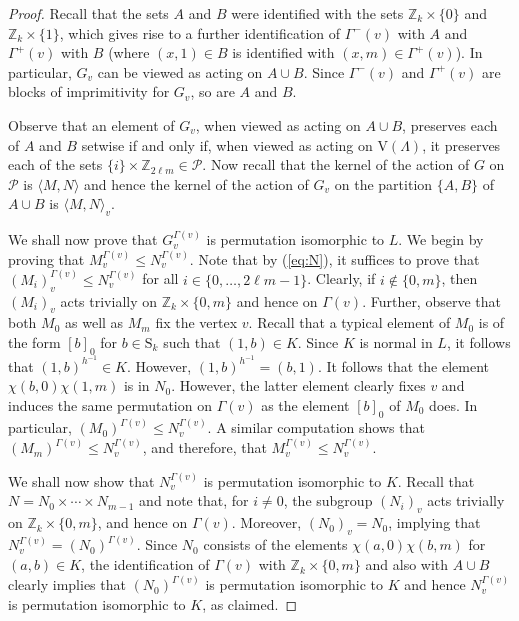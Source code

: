 \documentclass{amsart}
\theoremstyle{definition}
\begin{document}
\begin{proof}
Recall that the sets $A$ and $B$ were identified with the sets ${\mathbb Z}_k\times \{0\}$ and ${\mathbb Z}_k\times \{1\} $, which gives rise to a further identification of $\Gamma^-(v)$ with $A$ and $\Gamma^+(v)$ with $B$ (where $(x,1) \in B$ is identified with $(x,m) \in \Gamma^+(v)$). In particular, $G_v$ can be viewed as acting on $A\cup B$. Since $\Gamma^-(v)$ and $\Gamma^+(v)$ are blocks of imprimitivity for $G_v$, so are $A$ and $B$.

Observe that an element of $G_v$, when viewed as acting on $A\cup B$, preserves each of $A$ and $B$ setwise if and only if, when viewed as acting on ${\mathrm V}(\Lambda)$, it preserves each of the sets $\{i\} \times {\mathbb Z}_{2\ell m} \in {\mathcal P}$. Now recall that the kernel of the action of $G$ on ${\mathcal P}$ is ${\langle} M,N{\rangle}$ and hence the kernel of the action of $G_v$ on the partition $\{A,B\}$ of $A \cup B$ is ${\langle} M,N{\rangle}_v$. 

We shall now prove that $G_v^{\Gamma(v)}$ is permutation isomorphic to $L$.   We begin by proving that $M_v^{\Gamma(v)} \le N_v^{\Gamma(v)}$. Note that by (\ref{eq:N}), it suffices to prove that $(M_i)_v^{\Gamma(v)} \le N_v^{\Gamma(v)}$ for all $i\in \{0,\ldots,2\ell m - 1\}$. Clearly, if $i\not\in \{0,m\}$, then $(M_i)_v$ acts trivially on ${\mathbb Z}_k\times \{0,m\}$ and hence on $\Gamma(v)$. Further, observe that both $M_0$ as well as $M_m$ fix the vertex $v$. Recall that a typical element of $M_0$ is of the form $[b]_0$ for $b\in {\mathrm{S}}_k$ such that $(1,b) \in K$. Since $K$ is normal in $L$, it follows that $(1,b)^{h^{-1}} \in K$. However, $(1,b)^{h^{-1}} = (b,1)$. It follows that the element $\chi(b,0)\chi(1,m)$ is in $N_0$. However, the latter element clearly fixes $v$ and induces the same permutation on $\Gamma(v)$ as the element $[b]_0$ of $M_0$ does. In particular, $(M_0)^{\Gamma(v)} \le N_v^{\Gamma(v)}$. A similar computation shows that  $(M_m)^{\Gamma(v)} \le N_v^{\Gamma(v)}$, and therefore, that $M_v^{\Gamma(v)} \le N_v^{\Gamma(v)}$.

We shall now show that $N_v^{\Gamma(v)}$ is permutation isomorphic to $K$. Recall that  $N=N_0 \times \cdots \times N_{m-1}$ and note that, for $i\not = 0$, the subgroup $(N_i)_v$  acts trivially on $ {\mathbb Z}_k\times\{0,m\} $, and hence on  $\Gamma(v)$. Moreover, $(N_0)_v=N_0$, implying that $N_v^{\Gamma(v)} = (N_0)^{\Gamma(v)}$. Since $N_0$ consists of the elements $\chi(a,0)\chi(b,m)$ for $(a,b) \in K$, the identification of $\Gamma(v)$ with ${\mathbb Z}_k\times \{0,m\}$ and also with $A\cup B$ clearly implies that $(N_0)^{\Gamma(v)}$ is permutation isomorphic to $K$ and hence $N_v^{\Gamma(v)}$ is permutation isomorphic to $K$, as claimed.


\end{proof}
\end{document}
